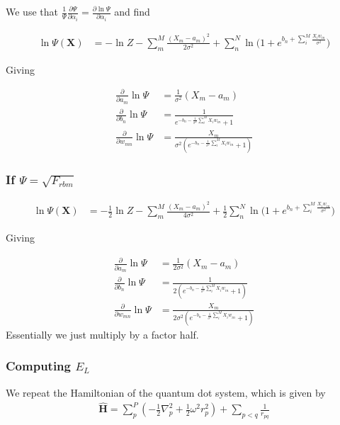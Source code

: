 \documentclass[twoside,english]{uiofysmaster}
\begin{document}
We use that $\frac{1}{\Psi}\frac{\partial \Psi}{\partial \alpha_i} 
	= \frac{\partial \ln{\Psi}}{\partial \alpha_i}$
and find

\begin{align}
	\ln{\Psi({\mathbf{X}})} &= -\ln{Z} - \sum_m^M \frac{(X_m - a_m)^2}{2\sigma^2}
	+ \sum_n^N \ln({1 + e^{b_n + \sum_i^M \frac{X_i w_{in}}{\sigma^2}})}
\end{align}

Giving

\begin{align}
	\frac{\partial }{\partial a_m} \ln\Psi
	&= 	\frac{1}{\sigma^2} (X_m - a_m) \\
	\frac{\partial }{\partial b_n} \ln\Psi
	&=
	\frac{1}{e^{-b_n-\frac{1}{\sigma^2}\sum_i^M X_i w_{in}} + 1} \\
	\frac{\partial }{\partial w_{mn}} \ln\Psi
	&= \frac{X_m}{\sigma^2(e^{-b_n-\frac{1}{\sigma^2}\sum_i^M X_i w_{in}} + 1)}
\end{align}

\subsubsection{If $\Psi = \sqrt{F_{rbm}}$}

\begin{align}
	\ln{\Psi({\mathbf{X}})} &= -\frac{1}{2}\ln{Z} - \sum_m^M \frac{(X_m - a_m)^2}{4\sigma^2}
	+ \frac{1}{2}\sum_n^N \ln({1 + e^{b_n + \sum_i^M \frac{X_i w_{in}}{\sigma^2}})}
\end{align}

Giving

\begin{align}
	\frac{\partial }{\partial a_m} \ln\Psi
	&= 	\frac{1}{2\sigma^2} (X_m - a_m) \\
	\frac{\partial }{\partial b_n} \ln\Psi
	&=
	\frac{1}{2(e^{-b_n-\frac{1}{\sigma^2}\sum_i^M X_i w_{in}} + 1)} \\
	\frac{\partial }{\partial w_{mn}} \ln\Psi
	&= \frac{X_m}{2\sigma^2(e^{-b_n-\frac{1}{\sigma^2}\sum_i^M X_i w_{in}} + 1)}
\end{align}
Essentially we just multiply by a factor half.

\subsubsection{Computing $E_L$}
We repeat the Hamiltonian of the quantum dot system, which is given by
\begin{align}
	\hat{\mathbf{H}} = \sum_p^P (-\frac{1}{2}\nabla_p^2 + \frac{1}{2}\omega^2 r_p^2 ) + \sum_{p<q} \frac{1}{r_{pq}}
\end{align}
\end{document}
